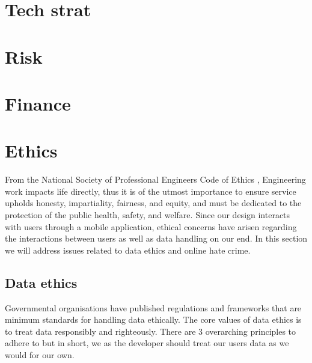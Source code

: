 \section{Tech strat}

\section{Risk}


\section{Finance}

\section{Ethics}
From the National Society of Professional Engineers Code of Ethics \cite{codeofethics}, Engineering
work impacts life directly, thus it is of the utmost importance to ensure service 
upholds honesty, impartiality, fairness, and equity, and must be dedicated to the protection of
the public health, safety, and welfare. Since our design interacts with users
through a mobile application, ethical concerns have arisen regarding the interactions between users 
as well as data handling on our end. In this section we will address issues related to data ethics 
and online hate crime.

\subsection{Data ethics}
Governmental organisations have published regulations \cite{EUdataregulations2018} and frameworks
\cite{framework} that are minimum standards for handling data ethically. The core values of data ethics 
is to treat data responsibly and righteously.
\linebreak
There are 3 overarching principles to adhere to but in short, we as the developer should treat our 
users\textsc{} data as we would for our own.

